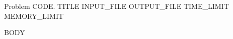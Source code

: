 \clearpage
\begingroup
\def\ShortProblemTitle{}
\begin{problem}{ Problem {{CODE}}. {{TITLE}} }{ {{INPUT_FILE}} }{ {{OUTPUT_FILE}} }{ {{TIME_LIMIT}} }{ {{MEMORY_LIMIT}} }
{{BODY}}
\end{problem}
\endgroup
